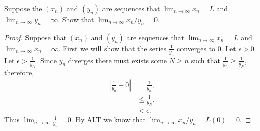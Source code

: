 \documentclass[12pt]{article}
\makeatletter
\theoremstyle{homework}
\newenvironment{exercise}[1]
{\def\@currentlabel{#1}\exercisecore}
{\endexercisecore}
\makeatother
\begin{document}
\begin{exercise}{1} Suppose the $(x_n)$ and $(y_n)$ are sequences that $\lim_{n \to  \infty} x_n = L$ and $\lim_{n \to  \infty} y_n = \infty$.
  Show that $\lim_{n \to  \infty} x_n/y_n = 0$. 
\begin{proof}
  Suppose that $(x_n)$ and $(y_n)$ are sequences that $\lim_{n \to  \infty} x_n = L$ and $\lim_{n \to  \infty} x_n = \infty$.
  First we will show that the series $\frac{1}{y_n}$ converges to 0. Let $\epsilon > 0$.  Let $\epsilon > \frac{1}{y_N}$. Since $y_n$ diverges there must exists some 
  $N \geq n$ such that $\frac{1}{y_n} \geq \frac{1}{y_N}$, therefore,
  \begin{align*}
    |\frac{1}{y_n} - 0| &= \frac{1}{y_n},\\
    &\le \frac{1}{y_N},\\
    &< \epsilon. 
  \end{align*}
  Thus $\lim_{n \to  \infty} \frac{1}{y_n} = 0$. By ALT we know that $\lim_{n \to  \infty} x_n/y_n = L(0) = 0$.
\end{proof}


\end{exercise}
\vspace{.5in}
\end{document}
